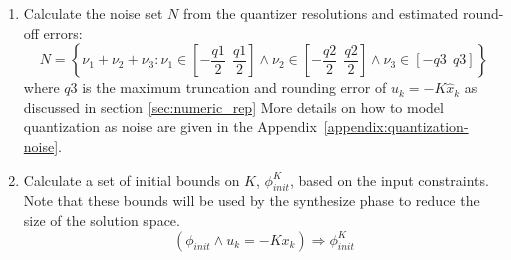\documentclass[runningheads,a4paper]{llncs}
\begin{document}
\begin{enumerate}
\begin{enumerate}
\item Calculate the noise set $N$ from the quantizer resolutions and estimated round-off errors: %
$$N=\left \{ \nu_1+\nu_2+ \nu_3 : \nu_1 \in \left[-\frac{q1}{2}\ \ \frac{q1}{2}\right] 
\wedge \nu_2 \in \left[-\frac{q2}{2}\ \ \frac{q2}{2}\right]  \wedge \nu_3 \in \left[-q3\ \ q3\right]  \right \}\nonumber$$
where $q3$ is the maximum truncation and rounding error of $u_k=-K\hat{x}_k$ as discussed in section \ref{sec:numeric_rep}
More details on how to model quantization as noise are given in the 
Appendix~\ref{appendix:quantization-noise}.
\item Calculate a set of initial bounds on $K$, $\phi_{init}^{K}$, based on the input constraints. Note that these bounds will be used by the {\sc synthesize} phase to reduce the size of the solution space.
$$(\phi_{init} \wedge u_k=-K x_k) \Rightarrow \phi_{init}^{K}$$


\end{enumerate}
\end{enumerate}
\end{document}
